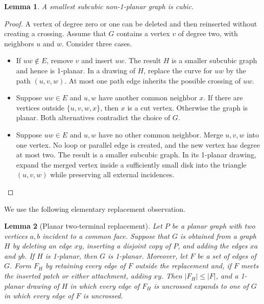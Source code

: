 \documentclass[a4paper,11pt]{article}
\theoremstyle{plain}
\newtheorem{lemma}{Lemma}
\theoremstyle{definition}  %
\begin{document}
\begin{lemma}
    A smallest subcubic non-1-planar graph is cubic.
\end{lemma}

\begin{proof}
    A vertex of degree zero or one can be deleted and then reinserted without
    creating a crossing.  Assume that $G$ contains a vertex $v$ of degree two,
    with neighbors $u$ and $w$. Consider three cases.
    \begin{itemize}
        \item If $uw\notin E$, remove $v$ and insert $uw$.  The result $H$ is
        a smaller subcubic graph and hence is 1-planar.  In a drawing of $H$,
        replace the curve for $uw$ by the path $(u,v,w)$.  At most one path
        edge inherits the possible crossing of $uw$.

        \item Suppose $uw\in E$ and $u,w$ have another common neighbor $x$.
        If there are vertices outside $\{u,v,w,x\}$, then $x$ is a cut vertex.
        Otherwise the graph is planar.  Both alternatives contradict the
        choice of $G$.

        \item Suppose $uw\in E$ and $u,w$ have no other common neighbor.
        Merge $u,v,w$ into one vertex.  No loop or parallel edge is created,
        and the new vertex has degree at most two.  The result is a smaller
        subcubic graph.  In its 1-planar drawing, expand the merged vertex
        inside a sufficiently small disk into the triangle $(u,v,w)$ while
        preserving all external incidences.
    \end{itemize}
\end{proof}

We use the following elementary replacement observation.

\begin{lemma}[Planar two-terminal replacement]\label{lem:two-terminal-replacement}
    Let $P$ be a planar graph with two vertices $a,b$ incident to a common
    face.  Suppose that $G$ is obtained from a graph $H$ by deleting an edge
    $xy$, inserting a disjoint copy of $P$, and adding the edges $xa$ and
    $yb$.  If $H$ is 1-planar, then $G$ is 1-planar.
    Moreover, let $F$ be a set of edges of $G$.  Form $F_H$ by retaining every
    edge of $F$ outside the replacement and, if $F$ meets the inserted patch
    or either attachment, adding $xy$.  Then $|F_H|\le |F|$, and a 1-planar
    drawing of $H$ in which every edge of $F_H$ is uncrossed expands to one of
    $G$ in which every edge of $F$ is uncrossed.
\end{lemma}
\end{document}
